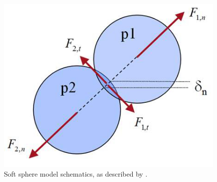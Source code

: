 \begin{figure}[!htb]
\centering
\includegraphics[width=.50\columnwidth]{images/062collision}
\caption[Soft sphere model]{Soft sphere model schematics, as described by
\citet{RefWorks:117}.}
\label{fig:062collision}
\end{figure}